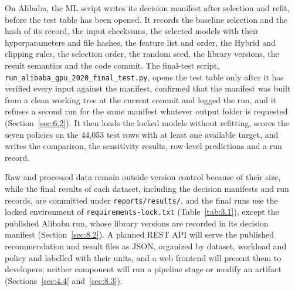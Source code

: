 On Alibaba, the ML script writes its decision manifest after selection and refit, before the test table has been opened. It records the baseline selection and the hash of its record, the input checksums, the selected models with their hyperparameters and file hashes, the feature list and order, the Hybrid and clipping rules, the selection order, the random seed, the library versions, the result semantics and the code commit. The final-test script, \texttt{run\_alibaba\_gpu\_2020\_final\_test.py}, opens the test table only after it has verified every input against the manifest, confirmed that the manifest was built from a clean working tree at the current commit and logged the run, and it refuses a second run for the same manifest whatever output folder is requested (Section~\ref{sec:6.2}). It then loads the locked models without refitting, scores the seven policies on the 44,053 test rows with at least one available target, and writes the comparison, the sensitivity results, row-level predictions and a run record.

Raw and processed data remain outside version control because of their size, while the final results of each dataset, including the decision manifests and run records, are committed under \texttt{reports/results/}, and the final runs use the locked environment of \texttt{requirements-lock.txt} (Table~\ref{tab:3.1}), except the published Alibaba run, whose library versions are recorded in its decision manifest (Section~\ref{sec:8.2}). A planned REST API will serve the published recommendation and result files as JSON, organized by dataset, workload and policy and labelled with their units, and a web frontend will present them to developers; neither component will run a pipeline stage or modify an artifact (Sections~\ref{sec:4.4} and~\ref{sec:8.3}).
